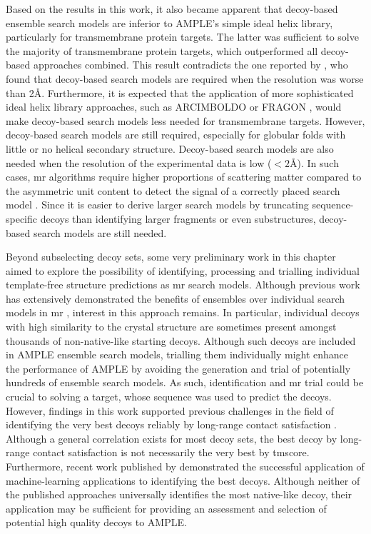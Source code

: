 Based on the results in this work, it also became apparent that decoy-based ensemble search models are inferior to AMPLE's simple ideal helix library, particularly for transmembrane protein targets. The latter was sufficient to solve the majority of transmembrane protein targets, which outperformed all decoy-based approaches combined. This result contradicts the one reported by \textcite{Thomas2017-sh}, who found that decoy-based search models are required when the resolution was worse than 2\AA. Furthermore, it is expected that the application of more sophisticated ideal helix library approaches, such as ARCIMBOLDO \cite{Millan2015-uf} or FRAGON \cite{Jenkins2018-gf}, would make decoy-based search models less needed for transmembrane targets. However, decoy-based search models are still required, especially for globular folds with little or no helical secondary structure. Decoy-based search models are also needed when the resolution of the experimental data is low ($<2$\AA). In such cases, \gls{mr} algorithms require higher proportions of scattering matter compared to the asymmetric unit content to detect the signal of a correctly placed search model \cite{McCoy2017-cz}. Since it is easier to derive larger search models by truncating sequence-specific decoys than identifying larger fragments or even substructures, decoy-based search models are still needed.

Beyond subselecting decoy sets, some very preliminary work in this chapter aimed to explore the possibility of identifying, processing and trialling individual template-free structure predictions as \gls{mr} search models. Although previous work has extensively demonstrated the benefits of ensembles over individual search models in \gls{mr} \cite{Rigden2018-zt,Keegan2018-kn,Thomas2015-wu}, interest in this approach remains. In particular, individual decoys with high similarity to the crystal structure are sometimes present amongst thousands of non-native-like starting decoys. Although such decoys are included in AMPLE ensemble search models, trialling them individually might enhance the performance of AMPLE by avoiding the generation and trial of potentially hundreds of ensemble search models. As such, identification and \gls{mr} trial could be crucial to solving a target, whose sequence was used to predict the decoys. However, findings in this work supported previous challenges in the field of identifying the very best decoys reliably by long-range contact satisfaction \cite{Adhikari2018-lj,De_Oliveira2016-gj,Kosciolek2014-bt}. Although a general correlation exists for most decoy sets, the best decoy by long-range contact satisfaction is not necessarily the very best by \gls{tmscore}. Furthermore, recent work published by \textcite{Uziela2018-yt,Keasar2018-jp,Mirzaei2016-wa} demonstrated the successful application of machine-learning applications to identifying the best decoys. Although neither of the published approaches universally identifies the most native-like decoy, their application may be sufficient for providing an assessment and selection of potential high quality decoys to AMPLE.

